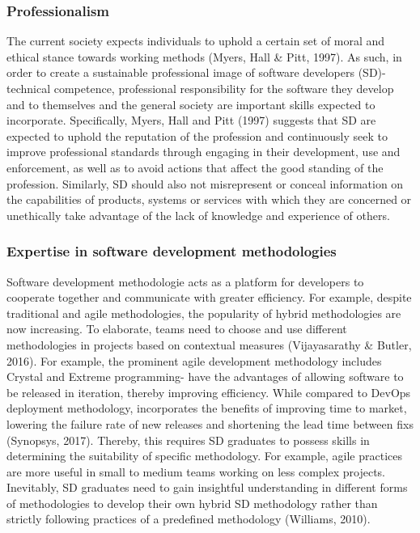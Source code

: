 \documentclass[a4paper, 11pt]{report}
\begin{document}
\subsubsection{Professionalism}
The current society expects individuals to uphold a certain set of moral and ethical stance towards working methods (Myers, Hall & Pitt, 1997). As such, in order to create a sustainable professional image of software developers (SD)- technical competence, professional responsibility for the software they develop and to themselves and the general society are important skills expected to incorporate. Specifically, Myers, Hall and Pitt (1997) suggests that SD are expected to uphold the reputation of the profession and continuously seek to improve professional standards through engaging in their development, use and enforcement, as well as to avoid actions that affect the good standing of the profession. Similarly, SD should also not misrepresent or conceal information on the capabilities of products, systems or services with which they are concerned or unethically take advantage of the lack of knowledge and experience of others. 
 
\subsubsection{Expertise in software development methodologies}
Software development methodologie acts as a platform for developers to cooperate together and communicate with greater efficiency. For example, despite traditional and agile methodologies, the popularity of hybrid methodologies are now increasing. To elaborate, teams need to choose and use different methodologies in projects based on contextual measures (Vijayasarathy & Butler, 2016). For example, the prominent agile development methodology includes Crystal and Extreme programming- have the advantages of allowing software to be released in iteration, thereby improving efficiency. While compared to DevOps deployment methodology, incorporates the benefits of improving time to market, lowering the failure rate of new releases and shortening the lead time between fixs (Synopsys, 2017). Thereby, this requires SD graduates to possess skills in determining the suitability of specific methodology. For example, agile practices are more useful in small to medium teams working on less complex projects. Inevitably, SD graduates need to gain insightful understanding in different forms of methodologies to develop their own hybrid SD methodology rather than strictly following practices of a predefined  methodology (Williams, 2010). 
\end{document}
